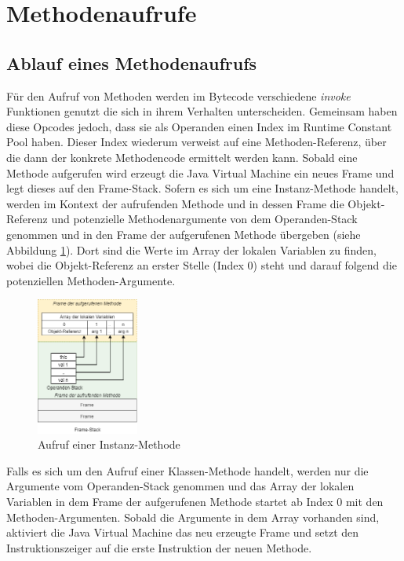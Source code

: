 \documentclass[conference]{IEEEtran}
\begin{document}
\section{Methodenaufrufe}
\subsection{Ablauf eines Methodenaufrufs}
Für den Aufruf von Methoden werden im Bytecode verschiedene \textit{invoke} Funktionen genutzt die sich in ihrem Verhalten unterscheiden. Gemeinsam haben diese Opcodes jedoch, dass sie als Operanden einen Index  im Runtime Constant Pool haben. Dieser Index wiederum verweist auf eine Methoden-Referenz, über die dann der konkrete Methodencode ermittelt werden kann. Sobald eine Methode aufgerufen wird erzeugt die Java Virtual Machine ein neues Frame und legt dieses auf den Frame-Stack. Sofern es sich um eine Instanz-Methode handelt, werden im Kontext der aufrufenden Methode und in dessen Frame die Objekt-Referenz und potenzielle Methodenargumente von dem Operanden-Stack genommen und in den Frame der aufgerufenen Methode übergeben (siehe Abbildung \ref{fig:aufrufMethode}). Dort sind die Werte im Array der lokalen Variablen zu finden, wobei die Objekt-Referenz an erster Stelle (Index 0) steht und darauf folgend die potenziellen Methoden-Argumente. 

\begin{figure}[htbp] 
  \centering
     \includegraphics[width=0.3\textwidth]{Grafiken/MethodenAufrufJVM.png}
  \caption{Aufruf einer Instanz-Methode}
  \label{fig:aufrufMethode}
\end{figure}

Falls es sich um den Aufruf einer Klassen-Methode handelt, werden nur die Argumente vom Operanden-Stack genommen und das Array der lokalen Variablen in dem Frame der aufgerufenen Methode startet ab Index 0 mit den Methoden-Argumenten. Sobald die Argumente in dem Array vorhanden sind, aktiviert die Java Virtual Machine das neu erzeugte Frame und setzt den Instruktionszeiger auf die erste Instruktion der neuen Methode.\cite{Venners.1997}
\end{document}
